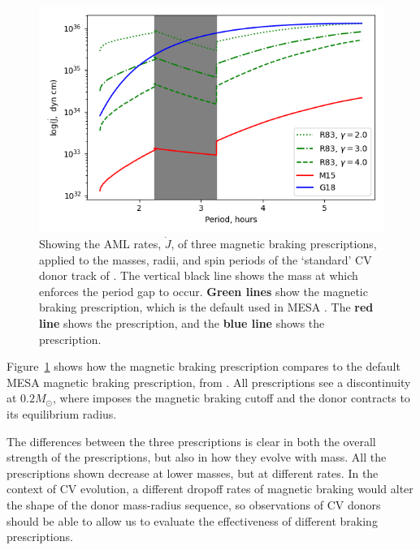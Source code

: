\begin{figure}
    \centering
    \includegraphics[width=\textwidth, trim={1cm 0 0 0}]{figures/introduction/rappaport_garraffo_matt_magbraking_period.png}
    \caption{Showing the AML rates, $\dot J$, of three magnetic braking prescriptions, applied to the masses, radii, and spin periods of the `standard' CV donor track of \citet{knigge11}. The vertical black line shows the mass at which \citet{knigge11} enforces the period gap to occur. {\bf Green lines} show the \citet{rappaport1983} magnetic braking prescription, which is the default used in MESA \citep{Paxton_2015}. The {\bf red line} shows the \citet{matt2015} prescription, and the {\bf blue line} shows the \citet{garraffo2018a} prescription.}
    \label{fig:introduction:rappaport garraffo matt magnetic braking}
\end{figure}

Figure~\ref{fig:introduction:rappaport garraffo matt magnetic braking} shows how the \citet{matt2015} magnetic braking prescription compares to the default MESA magnetic braking prescription, from \citet{rappaport1983}. All prescriptions see a discontinuity at $0.2M_\odot$, where \citet{knigge11} imposes the magnetic braking cutoff and the donor contracts to its equilibrium radius.

The differences between the three prescriptions is clear in both the overall strength of the prescriptions, but also in how they evolve with mass. All the prescriptions shown decrease at lower masses, but at different rates. In the context of CV evolution, a different dropoff rates of magnetic braking would alter the shape of the donor mass-radius sequence, so observations of CV donors should be able to allow us to evaluate the effectiveness of different braking prescriptions.


